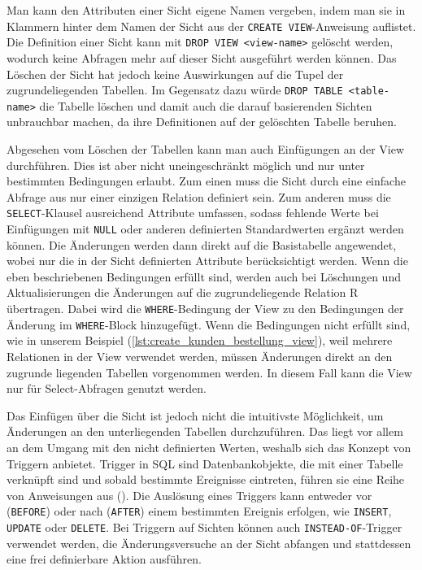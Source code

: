 

Man kann den Attributen einer Sicht eigene Namen vergeben, indem man sie in Klammern hinter dem Namen der Sicht aus der \texttt{CREATE VIEW}-Anweisung auflistet.
Die Definition einer Sicht kann mit \texttt{DROP VIEW <view-name>} gelöscht werden, wodurch keine Abfragen mehr auf dieser Sicht ausgeführt werden können.
Das Löschen der Sicht hat jedoch keine Auswirkungen auf die Tupel der zugrundeliegenden Tabellen.
Im Gegensatz dazu würde \texttt{DROP TABLE <table-name>} die Tabelle löschen und damit auch die darauf basierenden Sichten unbrauchbar machen, da ihre Definitionen auf der gelöschten Tabelle beruhen.

Abgesehen vom Löschen der Tabellen kann man auch Einfügungen an der View durchführen.
Dies ist aber nicht uneingeschränkt möglich und nur unter bestimmten Bedingungen erlaubt.
Zum einen muss die Sicht durch eine einfache Abfrage aus nur einer einzigen Relation definiert sein.
Zum anderen muss die \texttt{SELECT}-Klausel ausreichend Attribute umfassen, sodass fehlende Werte bei Einfügungen mit \texttt{NULL} oder anderen definierten Standardwerten ergänzt werden können.
Die Änderungen werden dann direkt auf die Basistabelle angewendet, wobei nur die in der Sicht definierten Attribute berücksichtigt werden.
Wenn die eben beschriebenen Bedingungen erfüllt sind, werden auch bei Löschungen und Aktualisierungen die Änderungen auf die zugrundeliegende Relation R übertragen.
Dabei wird die \texttt{WHERE}-Bedingung der View zu den Bedingungen der Änderung im \texttt{WHERE}-Block hinzugefügt.
Wenn die Bedingungen nicht erfüllt sind, wie in unserem Beispiel (\ref{lst:create_kunden_bestellung_view}), weil mehrere Relationen in der View verwendet werden, müssen Änderungen direkt an den zugrunde liegenden Tabellen vorgenommen werden.
In diesem Fall kann die View nur für Select-Abfragen genutzt werden.

Das Einfügen über die Sicht ist jedoch nicht die intuitivste Möglichkeit, um Änderungen an den unterliegenden Tabellen durchzuführen.
Das liegt vor allem an dem Umgang mit den nicht definierten Werten, weshalb sich das Konzept von Triggern anbietet.
Trigger in SQL sind Datenbankobjekte, die mit einer Tabelle verknüpft sind und sobald bestimmte Ereignisse eintreten, führen sie eine Reihe von Anweisungen aus (\cite{trigger_erklaerung}).
Die Auslösung eines Triggers kann entweder vor (\texttt{BEFORE}) oder nach (\texttt{AFTER}) einem bestimmten Ereignis erfolgen, wie \texttt{INSERT}, \texttt{UPDATE} oder \texttt{DELETE}.
Bei Triggern auf Sichten können auch \texttt{INSTEAD-OF}-Trigger verwendet werden, die Änderungsversuche an der Sicht abfangen und stattdessen eine frei definierbare Aktion ausführen.

